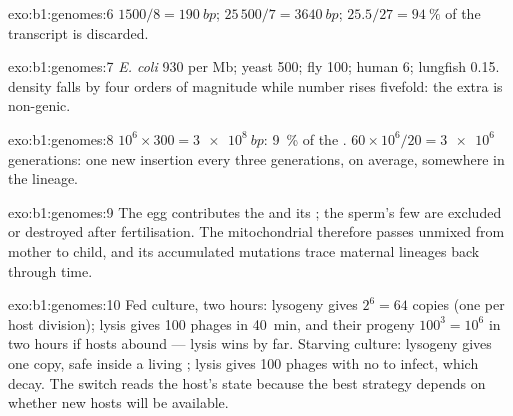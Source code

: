 \begin{solution}{exo:b1:genomes:6}
 $1500/8 = \qty{190}{bp}$;  $25\,500/7 = \qty{3640}{bp}$;
$25.5/27 = \qty{94}{\%}$ of the transcript is discarded.
\end{solution}

\begin{solution}{exo:b1:genomes:7}
\emph{E. coli} 930  per Mb; yeast 500; fly 100; human 6; lungfish
0.15.  density falls by four orders of magnitude while  number
rises fivefold: the extra  is non-genic.
\end{solution}

\begin{solution}{exo:b1:genomes:8}
$10^6\times 300 = \qty{3e8}{bp}$: \qty{9}{\%} of the . $60\times
10^6/20 = \num{3e6}$ generations: one new insertion every three
generations, on average, somewhere in the lineage.
\end{solution}

\begin{solution}{exo:b1:genomes:9}
The egg contributes the  and its ; the sperm's
few  are excluded or destroyed after fertilisation. The
mitochondrial  therefore passes unmixed from mother to child, and
its accumulated mutations trace maternal lineages back through time.
\end{solution}

\begin{solution}{exo:b1:genomes:10}
Fed culture, two hours: lysogeny gives $2^6 = 64$ copies (one per
host division); lysis gives 100 phages in \qty{40}{min}, and their
progeny $100^3 = 10^6$ in two hours if hosts abound --- lysis wins by
far. Starving culture: lysogeny gives one copy, safe inside a living
; lysis gives 100 phages with no  to infect, which decay. The
switch reads the host's state because the best strategy depends on
whether new hosts will be available.
\end{solution}


